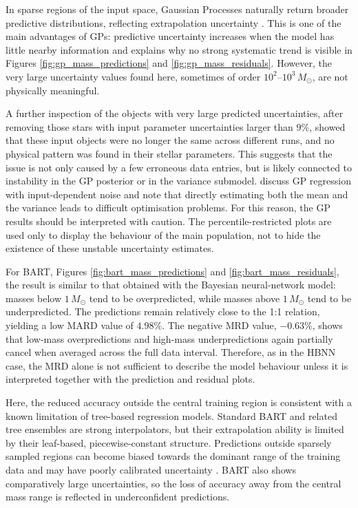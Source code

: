 In sparse regions of the input space, Gaussian Processes naturally return broader predictive distributions, reflecting extrapolation uncertainty \citep{cho2026}. This is one of the main advantages of GPs: predictive uncertainty increases when the model has little nearby information and explains why no strong systematic trend is visible in Figures \ref{fig:gp_mass_predictions} and \ref{fig:gp_mass_residuals}. However, the very large uncertainty values found here, sometimes of order $10^2$--$10^3\,M_\odot$, are not physically meaningful.

A further inspection of the objects with very large predicted uncertainties, after removing those stars with input parameter uncertainties larger than $9\%$, showed that these input objects were no longer the same across different runs, and no physical pattern was found in their stellar parameters. This suggests that the issue is not only caused by a few erroneous data entries, but is likely connected to instability in the GP posterior or in the variance submodel. \citet{le2005heteroscedasticgp} discuss GP regression with input-dependent noise and note that directly estimating both the mean and the variance leads to difficult optimisation problems. For this reason, the GP results should be interpreted with caution. The percentile-restricted plots are used only to display the behaviour of the main population, not to hide the existence of these unstable uncertainty estimates.

For BART, Figures \ref{fig:bart_mass_predictions} and \ref{fig:bart_mass_residuals}, the result is similar to that obtained with the Bayesian neural-network model: masses below $1\,M_\odot$ tend to be overpredicted, while masses above $1\,M_\odot$ tend to be underpredicted. The predictions remain relatively close to the 1:1 relation, yielding a low MARD value of $4.98\%$. The negative MRD value, $-0.63\%$, shows that low-mass overpredictions and high-mass underpredictions again partially cancel when averaged across the full data interval. Therefore, as in the HBNN case, the MRD alone is not sufficient to describe the model behaviour unless it is interpreted together with the prediction and residual plots.

Here, the reduced accuracy outside the central training region is consistent with a known limitation of tree-based regression models. Standard BART and related tree ensembles are strong interpolators, but their extrapolation ability is limited by their leaf-based, piecewise-constant structure. Predictions outside sparsely sampled regions can become biased towards the dominant range of the training data and may have poorly calibrated uncertainty \citep{zhang2019rerf}. BART also shows comparatively large uncertainties, so the loss of accuracy away from the central mass range is reflected in underconfident predictions.

